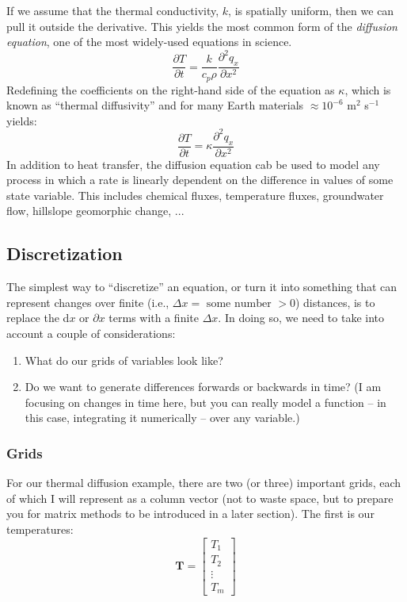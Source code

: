 \documentclass[a4paper,10pt]{scrartcl}
\begin{document}
If we assume that the thermal conductivity, $k$, is spatially uniform, then we can pull it outside the derivative. This yields the most common form of the \emph{diffusion equation}, one of the most widely-used equations in science.
\begin{equation}
 \frac{\partial T}{\partial t} = \frac{k}{c_p \rho} \frac{\partial^2 q_x}{\partial x^2}
\end{equation}
Redefining the coefficients on the right-hand side of the equation as $\kappa$, which is known as ``thermal diffusivity'' and for many Earth materials $\approx 10^{-6}$ m$^2$ s$^{-1}$ yields:
\begin{equation}
 \frac{\partial T}{\partial t} = \kappa \frac{\partial^2 q_x}{\partial x^2}
\end{equation}
In addition to heat transfer, the diffusion equation cab be used to model any process in which a rate is linearly dependent on the difference in values of some state variable. This includes chemical fluxes, temperature fluxes, groundwater flow, hillslope geomorphic change, ...

\subsection{Discretization}

The simplest way to ``discretize'' an equation, or turn it into something that can represent changes over finite (i.e., $\Delta x = \text{ some number } > 0$) distances, is to replace the d$x$ or $\partial x$ terms with a finite $\Delta x$. In doing so, we need to take into account a couple of considerations:
\begin{enumerate}
 \item What do our grids of variables look like?
 \item Do we want to generate differences forwards or backwards in time? (I am focusing on changes in time here, but you can really model a function -- in this case, integrating it numerically -- over any variable.)
\end{enumerate}

\subsubsection{Grids}

For our thermal diffusion example, there are two (or three) important grids, each of which I will represent as a column vector (not to waste space, but to prepare you for matrix methods to be introduced in a later section). The first is our temperatures:
\begin{equation}
 \boldsymbol{T} =
 \begin{bmatrix}
  T_{1} \\
  T_{2} \\
  \vdots \\
  T_{m}
 \end{bmatrix}
\end{equation}
\end{document}
